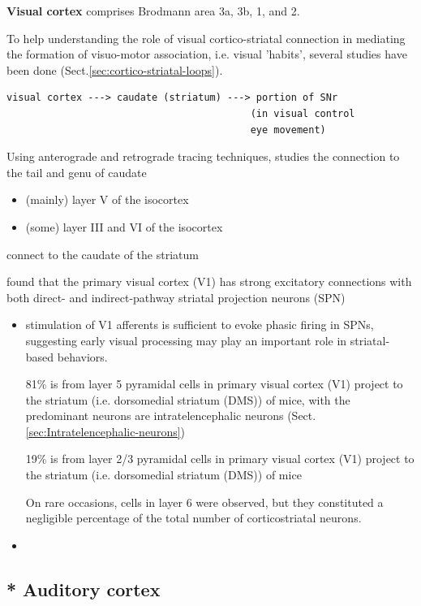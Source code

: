 {\bf Visual cortex} comprises Brodmann area 3a, 3b, 1, and 2.

To help understanding the role of visual cortico-striatal connection in
mediating the formation of visuo-motor association, i.e. visual 'habits',
several studies have been done (Sect.\ref{sec:cortico-striatal-loops}).
\begin{verbatim}
visual cortex ---> caudate (striatum) ---> portion of SNr 
                                          (in visual control 
                                          eye movement)
\end{verbatim}

Using anterograde and retrograde tracing techniques, \citep{saint-cyr1990}
studies the connection to the tail and genu of caudate 
\begin{itemize}
  \item (mainly) layer V of the isocortex
  \item (some) layer III and VI of the isocortex
\end{itemize}
connect to the caudate of the striatum

\citep{khibnik2014} found that the primary visual cortex (V1) has strong 
excitatory connections with both direct- and indirect-pathway striatal
projection neurons (SPN)
\begin{itemize}
  \item stimulation of V1 afferents is sufficient to evoke phasic firing in
  SPNs, suggesting early visual processing may play an important role in
  striatal-based behaviors.
  
  81\% is from layer 5 pyramidal cells in primary visual cortex (V1) project to
  the striatum (i.e. dorsomedial striatum (DMS)) of mice, with the predominant
  neurons are intratelencephalic neurons (Sect.\ref{sec:Intratelencephalic-neurons})
  
  19\% is from layer 2/3 pyramidal cells in primary visual cortex (V1) project to
  the striatum (i.e. dorsomedial striatum (DMS)) of mice
  
  On rare occasions, cells in layer 6 were observed, but they constituted a
  negligible percentage of the total number of corticostriatal neurons.
  
  \item 
\end{itemize}

\subsection{* Auditory cortex}
\label{sec:auditory-cortex}

